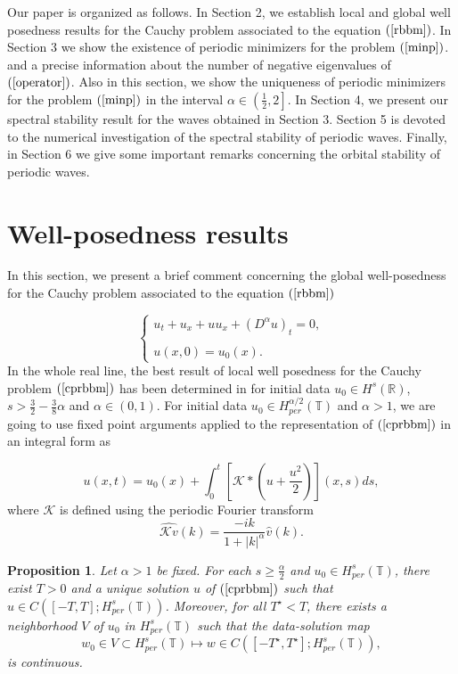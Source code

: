 \documentclass[12pt,reqno]{amsart}
\newcommand{\2}{L^2_{per}(0, T)}
\newtheorem{prop}{Proposition}[section]
\numberwithin{equation}{section}
\numberwithin{figure}{section}
\begin{document}
\indent Our paper is organized as follows. In Section 2, we establish local and global well posedness results for the Cauchy problem  associated to the equation $(\ref{rbbm})$. In Section 3 we show the existence of periodic minimizers for the problem $(\ref{minp})$. and a precise information about the number of negative eigenvalues of $(\ref{operator})$. Also in this section, we show the uniqueness of periodic minimizers for the problem $(\ref{minp})$ in the interval $\alpha\in\left(\frac{1}{2},2\right]$. In Section 4, we present our spectral stability result for the waves obtained in Section 3. Section 5 is devoted to the numerical investigation of the spectral stability of periodic waves. Finally, in Section 6 we give some important remarks concerning the orbital stability of periodic waves.

\section{Well-posedness results} In this section, we present a brief comment concerning the global well-posedness for the Cauchy problem associated to the equation $(\ref{rbbm})$

\begin{equation}\label{cprbbm}
\left\{\begin{array}{llll}
u_t +u_x +uu_x +(D^{\alpha}u)_t=0,\\\\
u(x,0)=u_0(x).
\end{array}\right.
\end{equation}
In the whole real line, the best result of local well posedness for the Cauchy problem $(\ref{cprbbm})$ has been determined in \cite{LPS}  for initial data  $u_0\in H^s(\mathbb{R})$, $s>\frac{3}{2}-\frac{3}{8}\alpha$
and $\alpha\in (0, 1)$. For  initial data $u_0\in H_{per}^{\alpha/2}(\mathbb{T})$ and $\alpha>1$, we are going to use fixed point arguments applied to the representation of $(\ref{cprbbm})$ in an integral form as

\begin{equation}\label{intform}
u(x,t)=u_0(x)+\int_0^t\left[\mathcal{K}\ast \left(u+\frac{u^2}{2}\right)\right](x,s)ds,
\end{equation}
where $\mathcal{K}$ is defined using the periodic Fourier transform
$$
\widehat{\mathcal{K}v}(k)=\frac{-ik}{1+|k|^{\alpha}}\widehat{v}(k).
$$

\begin{prop}\label{propwp}
	Let $\alpha>1$ be fixed. For each $s\geq\frac{\alpha}{2}$ and $u_0\in H_{per}^{s}(\mathbb{T})$, there exist $T>0$ and a unique solution $u$ of $(\ref{cprbbm})$ such that $u\in C([-T,T];H_{per}^{s}(\mathbb{T}))$. Moreover, for all $T^{\star}<T$, there exists a neighborhood $V$ of $u_0$ in $H_{per}^{s}(\mathbb{T})$ such that the data-solution map
	$$w_0\in V\subset H_{per}^{s}(\mathbb{T})\mapsto w\in C([-T^{\star},T^{\star}];H_{per}^{s}(\mathbb{T})),$$
	is continuous.
\end{prop}
\end{document}
